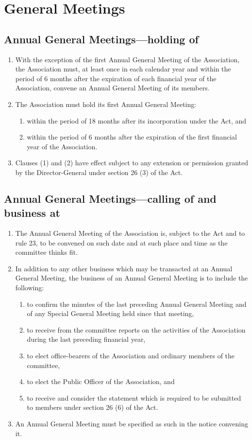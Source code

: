 \section{General Meetings}
\subsection{Annual General Meetings—holding of}
\begin{enumerate}
  \item With the exception of the first Annual General Meeting of the Association, the Association must, at least once in each calendar year and within the period of 6 months after the expiration of each financial year of the Association, convene an Annual General Meeting of its members.
  \item The Association must hold its first Annual General Meeting:
    \begin{enumerate}
      \item within the period of 18 months after its incorporation under the Act, and
      \item within the period of 6 months after the expiration of the first financial year of the Association.
    \end{enumerate}
  \item Clauses (1) and (2) have effect subject to any extension or permission granted by the Director-General under section 26 (3) of the Act.
\end{enumerate}
\subsection{Annual General Meetings—calling of and business at}
\begin{enumerate}
  \item The Annual General Meeting of the Association is, subject to the Act and to rule 23, to be convened on such date and at such place and time as the committee thinks fit.
  \item In addition to any other business which may be transacted at an Annual General Meeting, the business of an Annual General Meeting is to include the following:
    \begin{enumerate}
      \item to confirm the minutes of the last preceding Annual General Meeting and of any Special General Meeting held since that meeting,
      \item to receive from the committee reports on the activities of the Association during the last preceding financial year,
      \item to elect office-bearers of the Association and ordinary members of the committee,
      \item to elect the Public Officer of the Association, and
      \item to receive and consider the statement which is required to be submitted to members under section 26 (6) of the Act.
    \end{enumerate}
  \item An Annual General Meeting must be specified as such in the notice convening it.
\end{enumerate}
